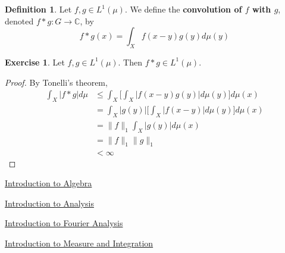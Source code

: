 \documentclass[12pt]{amsart}
\theoremstyle{definition}
\newtheorem{defn}[definition]{Definition}
\newtheorem{ex}[definition]{Exercise}
\newcommand{\C}{\mathbb{C}}
\newcommand{\lex}[1]{\label{ex:#1}}
\newcommand{\ld}[1]{\label{defn:#1}}
\begin{document}
	\begin{defn} \ld{00000} 
	Let $f, g \in L^1(\mu)$. We define the \textbf{convolution of $f$ with $g$}, denoted $f * g: G \rightarrow \C$, by $$ f * g(x) = \int_X f(x-y)g(y) d\mu(y)$$
	\end{defn}
	
	\begin{ex} \lex{00000} 
	Let $f, g \in L^1(\mu)$. Then $f * g \in L^1(\mu)$. 
	\end{ex}
	
	\begin{proof}
	By Tonelli's theorem, 
	\begin{align*}
	\int_X |f *g| d\mu 
	&\leq \int_X \bigg[  \int_X |f(x-y)g(y)| d\mu(y) \bigg] d\mu(x) \\
	&= \int_X |g(y)| \bigg[  \int_X |f(x-y)| d\mu(y) \bigg] d\mu(x) \\
	&=  \|f\|_1 \int_X |g(y)| d\mu(x) \\
	&= \|f\|_1 \|g\|_1\\
	& < \infty
	\end{align*}
	\end{proof}
	
	
	
	
	
	
	
	
	
	
	\newpage
	\begin{thebibliography}{4}
	
 \href{https://github.com/carsonaj/Mathematics/blob/master/Introduction\%20to\%20Algebra/Introduction\%20to\%20Algebra.pdf}{Introduction to Algebra}

  \href{https://github.com/carsonaj/Mathematics/blob/master/Introduction\%20to\%20Analysis/Introduction\%20to\%20Analysis.pdf}{Introduction to Analysis}	

  \href{https://github.com/carsonaj/Mathematics/blob/master/Introduction\%20to\%20Fourier\%20Analysis/Introduction\%20to\%20Fourier\%20Analysis.pdf}{Introduction to Fourier Analysis}

  \href{https://github.com/carsonaj/Mathematics/blob/master/Introduction\%20to\%20Measure\%20and\%20Integration/Introduction\%20to\%20Measure\%20and\%20Integration.pdf}{Introduction to Measure and Integration}


\end{thebibliography}
	
	
	
\end{document}
